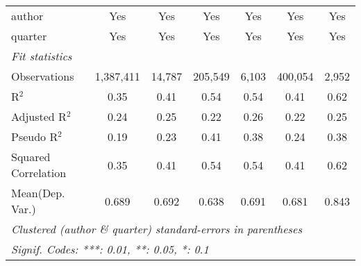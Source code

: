 \begin{tabular}{lcccccc}
   author                                                     & Yes            & Yes           & Yes           & Yes          & Yes            & Yes\\  
   quarter                                                    & Yes            & Yes           & Yes           & Yes          & Yes            & Yes\\  
   \midrule
   \emph{Fit statistics}\\
   Observations                                               & 1,387,411      & 14,787        & 205,549       & 6,103        & 400,054        & 2,952\\  
   R$^2$                                                      & 0.35           & 0.41          & 0.54          & 0.54         & 0.41           & 0.62\\  
   Adjusted R$^2$                                             & 0.24           & 0.25          & 0.22          & 0.26         & 0.22           & 0.25\\  
   Pseudo R$^2$                                               & 0.19           & 0.23          & 0.41          & 0.38         & 0.24           & 0.38\\  
   Squared Correlation                                        & 0.35           & 0.41          & 0.54          & 0.54         & 0.41           & 0.62\\  
Mean(Dep. Var.) & 0.689 & 0.692 & 0.638 & 0.691 & 0.681 & 0.843 \\
   \midrule \midrule
   \multicolumn{7}{l}{\emph{Clustered (author \& quarter) standard-errors in parentheses}}\\
   \multicolumn{7}{l}{\emph{Signif. Codes: ***: 0.01, **: 0.05, *: 0.1}}\\
\end{tabular}
\par\endgroup
